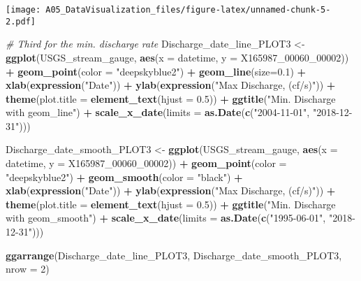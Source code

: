 \documentclass[]{article}
\newenvironment{Shaded}{\begin{snugshade}}{\end{snugshade}}
\newcommand{\KeywordTok}[1]{\textcolor[rgb]{0.13,0.29,0.53}{\textbf{#1}}}
\newcommand{\DataTypeTok}[1]{\textcolor[rgb]{0.13,0.29,0.53}{#1}}
\newcommand{\DecValTok}[1]{\textcolor[rgb]{0.00,0.00,0.81}{#1}}
\newcommand{\FloatTok}[1]{\textcolor[rgb]{0.00,0.00,0.81}{#1}}
\newcommand{\StringTok}[1]{\textcolor[rgb]{0.31,0.60,0.02}{#1}}
\newcommand{\CommentTok}[1]{\textcolor[rgb]{0.56,0.35,0.01}{\textit{#1}}}
\newcommand{\OperatorTok}[1]{\textcolor[rgb]{0.81,0.36,0.00}{\textbf{#1}}}
\newcommand{\NormalTok}[1]{#1}
\begin{document}
\texttt{[image: A05\_DataVisualization\_files/figure-latex/unnamed-chunk-5-2.pdf]}

\begin{Shaded}
\begin{Highlighting}[]
\CommentTok{# Third for the min. discharge rate}
\NormalTok{Discharge_date_line_PLOT3 <-}\StringTok{ }\KeywordTok{ggplot}\NormalTok{(USGS_stream_gauge, }
                                   \KeywordTok{aes}\NormalTok{(}\DataTypeTok{x =}\NormalTok{ datetime, }\DataTypeTok{y =}\NormalTok{ X165987_00060_}\DecValTok{00002}\NormalTok{)) }\OperatorTok{+}
\StringTok{  }\KeywordTok{geom_point}\NormalTok{(}\DataTypeTok{color =} \StringTok{"deepskyblue2"}\NormalTok{) }\OperatorTok{+}
\StringTok{  }\KeywordTok{geom_line}\NormalTok{(}\DataTypeTok{size=}\FloatTok{0.1}\NormalTok{) }\OperatorTok{+}
\StringTok{  }\KeywordTok{xlab}\NormalTok{(}\KeywordTok{expression}\NormalTok{(}\StringTok{"Date"}\NormalTok{)) }\OperatorTok{+}
\StringTok{  }\KeywordTok{ylab}\NormalTok{(}\KeywordTok{expression}\NormalTok{(}\StringTok{"Max Discharge, (cf/s)"}\NormalTok{)) }\OperatorTok{+}
\StringTok{  }\KeywordTok{theme}\NormalTok{(}\DataTypeTok{plot.title =} \KeywordTok{element_text}\NormalTok{(}\DataTypeTok{hjust =} \FloatTok{0.5}\NormalTok{)) }\OperatorTok{+}
\StringTok{  }\KeywordTok{ggtitle}\NormalTok{(}\StringTok{"Min. Discharge with geom_line"}\NormalTok{) }\OperatorTok{+}
\StringTok{  }\KeywordTok{scale_x_date}\NormalTok{(}\DataTypeTok{limits =} \KeywordTok{as.Date}\NormalTok{(}\KeywordTok{c}\NormalTok{(}\StringTok{"2004-11-01"}\NormalTok{, }\StringTok{"2018-12-31"}\NormalTok{)))}


\NormalTok{Discharge_date_smooth_PLOT3 <-}\StringTok{ }\KeywordTok{ggplot}\NormalTok{(USGS_stream_gauge, }\KeywordTok{aes}\NormalTok{(}\DataTypeTok{x =}\NormalTok{ datetime, }\DataTypeTok{y =}\NormalTok{ X165987_00060_}\DecValTok{00002}\NormalTok{)) }\OperatorTok{+}
\StringTok{  }\KeywordTok{geom_point}\NormalTok{(}\DataTypeTok{color =} \StringTok{"deepskyblue2"}\NormalTok{) }\OperatorTok{+}
\StringTok{  }\KeywordTok{geom_smooth}\NormalTok{(}\DataTypeTok{color =} \StringTok{"black"}\NormalTok{) }\OperatorTok{+}
\StringTok{  }\KeywordTok{xlab}\NormalTok{(}\KeywordTok{expression}\NormalTok{(}\StringTok{"Date"}\NormalTok{)) }\OperatorTok{+}
\StringTok{  }\KeywordTok{ylab}\NormalTok{(}\KeywordTok{expression}\NormalTok{(}\StringTok{"Max Discharge, (cf/s)"}\NormalTok{)) }\OperatorTok{+}
\StringTok{  }\KeywordTok{theme}\NormalTok{(}\DataTypeTok{plot.title =} \KeywordTok{element_text}\NormalTok{(}\DataTypeTok{hjust =} \FloatTok{0.5}\NormalTok{)) }\OperatorTok{+}
\StringTok{  }\KeywordTok{ggtitle}\NormalTok{(}\StringTok{"Min. Discharge with geom_smooth"}\NormalTok{) }\OperatorTok{+}
\StringTok{  }\KeywordTok{scale_x_date}\NormalTok{(}\DataTypeTok{limits =} \KeywordTok{as.Date}\NormalTok{(}\KeywordTok{c}\NormalTok{(}\StringTok{"1995-06-01"}\NormalTok{, }\StringTok{"2018-12-31"}\NormalTok{)))}


\KeywordTok{ggarrange}\NormalTok{(Discharge_date_line_PLOT3, Discharge_date_smooth_PLOT3, }\DataTypeTok{nrow =} \DecValTok{2}\NormalTok{)}
\end{Highlighting}
\end{Shaded}
\end{document}
